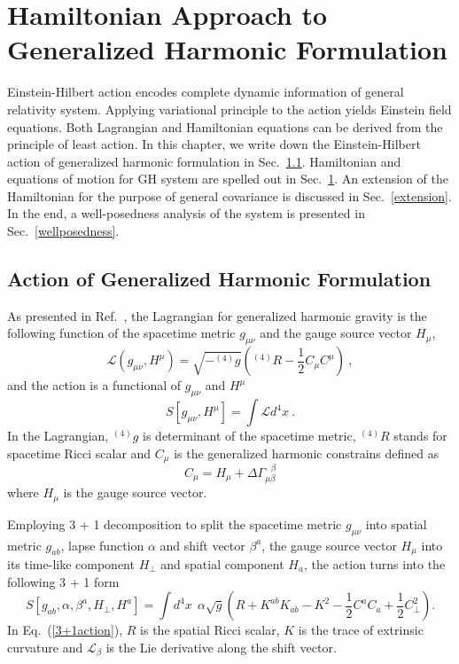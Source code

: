 \chapter{Hamiltonian Approach to Generalized Harmonic Formulation}\label{hamiltonian}
Einstein-Hilbert action encodes complete dynamic information of general relativity system. Applying variational principle to the action yields Einstein field equations. Both Lagrangian and Hamiltonian equations can be derived from the principle of least action. In this chapter, we write down the Einstein-Hilbert action of generalized harmonic formulation in Sec.~\ref{action}. Hamiltonian and equations of motion for GH system are spelled out in Sec.~\ref{hamiltonian}. An extension of the Hamiltonian for the purpose of general covariance is discussed in Sec.~\ref{extension}. In the end, a well-posedness analysis of the system is presented in Sec.~\ref{wellposedness}. 
\section{Action of Generalized Harmonic Formulation}\label{action}
As presented in Ref.~\cite{Brown:2010rya}, the Lagrangian for generalized harmonic gravity is the following function of the spacetime metric $g_{\mu\nu}$ and the gauge source vector $H_{\mu}$, 
\begin{equation}
\mathscr{L}\left(g_{\mu\nu}, H^{\mu}\right) = \sqrt{-^{(4)}g} \left(^{(4)}R - \frac{1}{2}C_{\mu}C^{\mu}\right) \ , 
\end{equation}
and the action is a functional of $g_{\mu\nu}$ and $H^{\mu}$
\begin{equation}\label{action}
S\left[g_{\mu\nu}, H^{\mu}\right] = \int \mathscr{L} d^{4}x \ .
\end{equation}
In the Lagrangian, $^{(4)}g$ is determinant of the spacetime metric, $^{(4)}R$ stands for spacetime Ricci scalar and $C_{\mu}$ is the generalized harmonic constrains defined as
\begin{equation}
C_{\mu} = H_{\mu} + \Delta \Gamma^{~~~\beta}_{\mu\beta}
\end{equation}
where $H_{\mu}$ is the gauge source vector. 

Employing 3 + 1 decomposition to split the spacetime metric $g_{\mu\nu}$ into spatial metric $g_{ab}$, lapse function $\alpha$ and shift vector $\beta^{a}$, the gauge source vector $H_{\mu}$ into its time-like component $H_{\perp}$ and spatial component $H_{a}$, the action turns into the following 3 + 1 form
\begin{equation}\label{3+1action}
S\left[g_{ab}, \alpha, \beta^{a}, H_{\perp}, H^{a}\right] = \int d^{4}x~~\alpha \sqrt{g} \left( R + K^{ab}K_{ab} - K^{2} - \frac{1}{2}C^{a}C_{a} + \frac{1}{2}C_{\perp}^{2}\right).
\end{equation}
In Eq.~(\ref{3+1action}), $R$ is the spatial Ricci scalar, $K$ is the trace of extrinsic curvature and $\mathcal{L}_{\beta}$ is the Lie derivative along the shift vector. 

